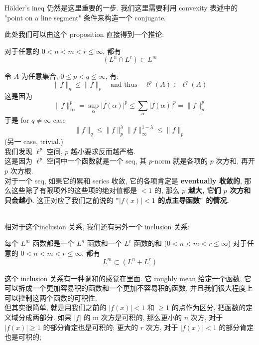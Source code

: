 \documentclass[lang=cn,11pt]{elegantbook}
\begin{document}
\begin{remark}
    Hölder's ineq 仍然是这里重要的一步. 我们这里需要利用 convexity 表述中的 "point on a line segment" 条件来构造一个 conjugate.
\end{remark}
\begin{remark}
    此处我们可以由这个 proposition 直接得到一个推论: \

\begin{corollary}
    对于任意的 $0< n < m < r \leq \infty$, 都有  \[
   (L^n \cap L^r) \subset L^m
    \]
\end{corollary}
\end{remark}

\begin{example}
    令 $A$ 为任意集合, $0\leq p < q \leq \infty$, 有: \[
 \|f \|_q \leq \|f \|_p \quad \text{and thus} \quad \ell^p(A) \subset \ell^q(A)
    \]
    这是因为 \[
    \|f \|_\infty ^p  = \sup_\alpha |f(\alpha)|^p \leq \sum_\alpha |f(\alpha)|^p = \|f \|_p^p
    \]
    于是 for $q\not = \infty$ case  \[
    \|f \|_q \leq \|f \|_p^\lambda \|f\|_\infty^{1-\lambda }  \leq \|f\|_p
    \]
(另一 case, trivial.)\\
我们发现 $\ell^p$ 空间, $p$ 越小要求反而越严格. \\
这是因为 $\ell^p$ 空间中一个函数就是一个 seq, 其 $p$-norm 就是各项的 $p$ 次方和, 再开 $p$ 次方根.\\
对于一个 seq, 如果它的累和 series 收敛, 它的各项肯定是 \textbf{eventually 收敛的}, 那么这些除了有限项外的这些项的绝对值都是 $<1$ 的, 那么\textbf{ $p$ 越大,  它们 $p$ 次方和只会越小}. 这正对应了我们之前说的 \textbf{"$|f(x)| < 1$ 的点主导函数" 的情况.}\\\\
\end{example}

相对于这个inclusion 关系, 我们还有另外一个 inclusion 关系: 
\begin{proposition}{每个 $L^m$ 函数都是一个 $L^n$ 函数和一个 $L^r$ 函数的和 ($0< n < m < r \leq \infty$)}
 对于任意的 $0< n < m < r \leq \infty$, 都有  \[
   L^m\subset  (L^n + L^r)
    \]
\end{proposition}
这个 inclusion 关系有一种调和的感觉在里面. 它 roughly mean 给定一个函数, 它可以拆成一个更加容易积的函数和一个更加不容易积的函数, 并且我们很大程度上可以控制这两个函数的可积性.\\
但其实很简单, 就是用我们之前的 $|f(x)|<1$ 和 $\geq 1$ 的点作为区分, 把函数的定义域分成两部分. 如果 $|f|$ 的 m 次方是可积的, 那么更小的 $n$ 次方, 对于 $|f(x)| \geq 1$ 的部分肯定也是可积的; 更大的 $r$ 次方, 对于 $|f(x)|< 1$ 的部分肯定也是可积的;
\end{document}
